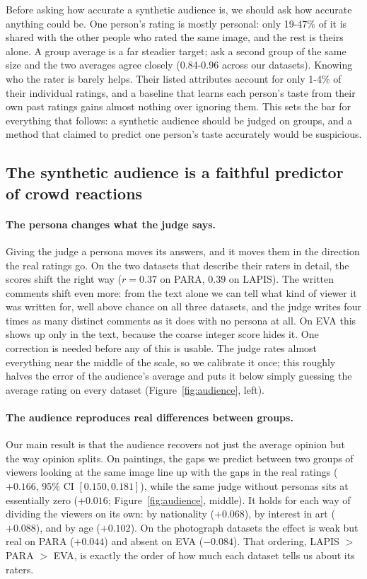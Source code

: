 \documentclass[10pt,twocolumn,letterpaper]{article}
\begin{document}
Before asking how accurate a synthetic audience is, we should ask how accurate anything could be. One person's rating is mostly personal: only 19-47\% of it is shared with the other people who rated the same image, and the rest is theirs alone. A group average is a far steadier target; ask a second group of the same size and the two averages agree closely (0.84-0.96 across our datasets). Knowing who the rater is barely helps. Their listed attributes account for only 1-4\% of their individual ratings, and a baseline that learns each person's taste from their own past ratings gains almost nothing over ignoring them. This sets the bar for everything that follows: a synthetic audience should be judged on groups, and a method that claimed to predict one person's taste accurately would be suspicious.

\subsection{The synthetic audience is a faithful predictor of crowd reactions}
\label{sec:audience}

\paragraph{The persona changes what the judge says.} Giving the judge a persona moves its answers, and it moves them in the direction the real ratings go. On the two datasets that describe their raters in detail, the scores shift the right way ($r{=}0.37$ on PARA, $0.39$ on LAPIS). The written comments shift even more: from the text alone we can tell what kind of viewer it was written for, well above chance on all three datasets, and the judge writes four times as many distinct comments as it does with no persona at all. On EVA this shows up only in the text, because the coarse integer score hides it. One correction is needed before any of this is usable. The judge rates almost everything near the middle of the scale, so we calibrate it once; this roughly halves the error of the audience's average and puts it below simply guessing the average rating on every dataset (Figure~\ref{fig:audience}, left).

\paragraph{The audience reproduces real differences between groups.} Our main result is that the audience recovers not just the average opinion but the way opinion splits. On paintings, the gaps we predict between two groups of viewers looking at the same image line up with the gaps in the real ratings ($+0.166$, 95\% CI $[0.150, 0.181]$), while the same judge without personas sits at essentially zero ($+0.016$; Figure~\ref{fig:audience}, middle). It holds for each way of dividing the viewers on its own: by nationality ($+0.068$), by interest in art ($+0.088$), and by age ($+0.102$). On the photograph datasets the effect is weak but real on PARA ($+0.044$) and absent on EVA ($-0.084$). That ordering, LAPIS $>$ PARA $>$ EVA, is exactly the order of how much each dataset tells us about its raters.
\end{document}
